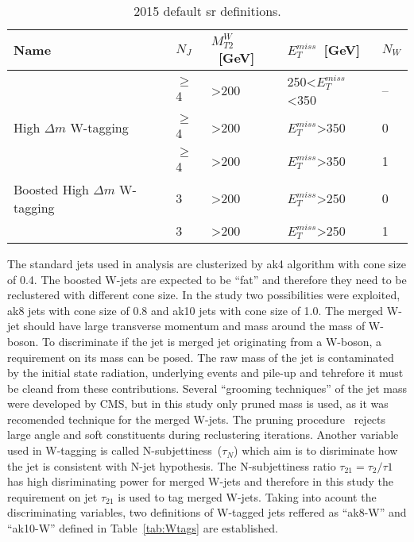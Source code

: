 \begin{table}[h]
\begin{center}
\begin{tabular}{|l|l|l|l|l|}
\hline
Name            & $N_{J}$  & $M_{T2}^{W}$~[GeV]            & $E_{T}^{miss}$~[GeV]    & $N_{W}$ \\
\hline
\hline
                          & $\geq$4  & >200                & 250<$E_{T}^{miss}$<350   & --   \\
High $\Delta m$ W-tagging & $\geq$4  & >200                & $E_{T}^{miss}$>350       & 0    \\
                          & $\geq$4  & >200                & $E_{T}^{miss}$>350       & 1    \\
\hline
Boosted High $\Delta m$ W-tagging & 3  & >200              & $E_{T}^{miss}$>250 & 0  \\
                                  & 3  & >200              & $E_{T}^{miss}$>250 & 1  \\
\hline
\end{tabular}
\caption[Table caption text]{2015 default sr definitions. }
\label{tab:SRW}
\end{center}
\end{table}


The standard jets used in analysis are clusterized by ak4 algorithm with cone size of 0.4. The boosted W-jets are expected to be ``fat'' and therefore they need to be reclustered with different cone size. In the study two possibilities were exploited, ak8 jets with cone size of 0.8 and ak10 jets with cone size of 1.0. The merged W-jet should have large transverse momentum and mass around the mass of W-boson. To discriminate if the jet is merged jet originating from a W-boson, a requirement on its mass can be posed. The raw mass  of the jet is contaminated by the initial state radiation, underlying events and pile-up and tehrefore it must be cleand from these contributions. Several ``grooming techniques'' of the jet mass were developed by CMS, but in this study only pruned mass is used, as it was recomended technique for the merged W-jets. The pruning procedure~\cite{Ellis:2009su} rejects large angle and soft constituents during reclustering iterations. Another variable used in W-tagging is called N-subjettiness~($\tau_{N}$) which aim is to disriminate how the jet is consistent with N-jet hypothesis. The N-subjettiness ratio $\tau_{21} = \tau_{2}/\tau{1}$ has high disriminating power for merged W-jets and therefore in this study the requirement on jet $\tau_{21}$ is used to tag merged W-jets. Taking into acount the discriminating variables, two definitions of W-tagged jets reffered as ``ak8-W'' and ``ak10-W'' defined in Table~\ref{tab:Wtags} are established.



